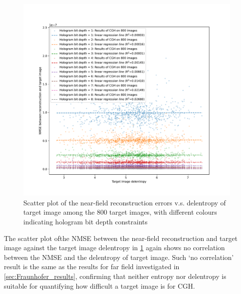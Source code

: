 	\begin{figure} [H]
		\begin{center}
		\includegraphics[trim={50 40 70 70}, clip, width = \textwidth]{GS_Fresnel0.1_NMSE_VS_Delentropy.pdf}
		\end{center}
		\caption{\label{fig:GS_Fresnel0.1_NMSE_VS_Delentropy} Scatter plot of the near-field reconstruction errors v.s. delentropy of target image among the 800 target images, with different colours indicating hologram bit depth constraints}
	\end{figure}


	The scatter plot ofthe NMSE between the near-field reconstruction and target image against the target image delentropy in \cref{fig:GS_Fresnel0.1_NMSE_VS_Delentropy} again shows no correlation between the NMSE and the delentropy of target image. Such `no correlation' result is the same as the results for far field investigated in \cref{sec:Fraunhofer_results}, confirming that neither entropy nor delentropy is suitable for quantifying how difficult a target image is for CGH.



